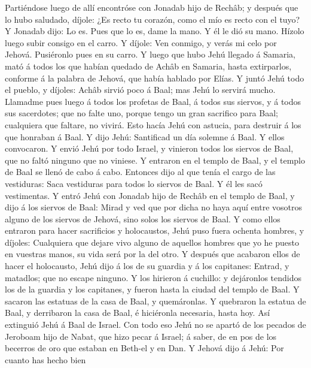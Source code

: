  Partiéndose luego de allí encontróse con Jonadab hijo de
Rechâb; y después que lo hubo saludado, díjole: ¿Es recto tu corazón,
como el mío es recto con el tuyo? Y Jonadab dijo: Lo es. Pues que lo es,
dame la mano. Y él le dió su mano. Hízolo luego subir consigo en el
carro.  Y díjole: Ven conmigo, y verás mi celo por
Jehová. Pusiéronlo pues en su carro.  Y luego que hubo
Jehú llegado á Samaria, mató á todos los que habían quedado de Achâb en
Samaria, hasta extirparlos, conforme á la palabra de Jehová, que había
hablado por Elías.  Y juntó Jehú todo el pueblo, y
díjoles: Achâb sirvió poco á Baal; mas Jehú lo servirá mucho.
 Llamadme pues luego á todos los profetas de Baal, á
todos sus siervos, y á todos sus sacerdotes; que no falte uno, porque
tengo un gran sacrifico para Baal; cualquiera que faltare, no vivirá.
Esto hacía Jehú con astucia, para destruir á los que honraban á Baal.
 Y dijo Jehú: Santificad un día solemne á Baal. Y ellos
convocaron.  Y envió Jehú por todo Israel, y vinieron
todos los siervos de Baal, que no faltó ninguno que no viniese. Y
entraron en el templo de Baal, y el templo de Baal se llenó de cabo á
cabo.  Entonces dijo al que tenía el cargo de las
vestiduras: Saca vestiduras para todos lo siervos de Baal. Y él les sacó
vestimentas.  Y entró Jehú con Jonadab hijo de Rechâb en
el templo de Baal, y dijo á los siervos de Baal: Mirad y ved que por
dicha no haya aquí entre vosotros alguno de los siervos de Jehová, sino
solos los siervos de Baal.  Y como ellos entraron para
hacer sacrificios y holocaustos, Jehú puso fuera ochenta hombres, y
díjoles: Cualquiera que dejare vivo alguno de aquellos hombres que yo he
puesto en vuestras manos, su vida será por la del otro. 
Y después que acabaron ellos de hacer el holocausto, Jehú dijo á los de
su guardia y á los capitanes: Entrad, y matadlos; que no escape ninguno.
Y los hirieron á cuchillo: y dejáronlos tendidos los de la guardia y los
capitanes, y fueron hasta la ciudad del templo de Baal. 
Y sacaron las estatuas de la casa de Baal, y quemáronlas.
 Y quebraron la estatua de Baal, y derribaron la casa de
Baal, é hiciéronla necesaria, hasta hoy.  Así extinguió
Jehú á Baal de Israel.  Con todo eso Jehú no se apartó de
los pecados de Jeroboam hijo de Nabat, que hizo pecar á Israel; á saber,
de en pos de los becerros de oro que estaban en Beth-el y en Dan.
 Y Jehová dijo á Jehú: Por cuanto has hecho bien
